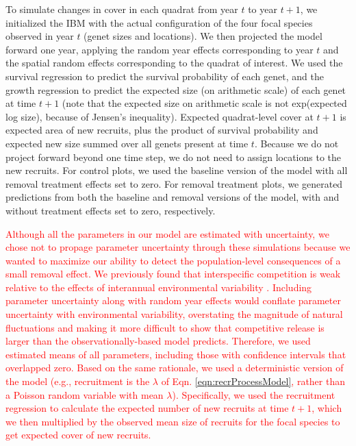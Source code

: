 \documentclass[11pt]{article}
\newcommand{\new}{\textcolor{red}}
\begin{document}
\begin{doublespacing}
To simulate changes in cover in each quadrat from year $t$ to year $t+1$, we initialized the IBM with the actual 
configuration of the four focal species observed in year $t$ (genet sizes and locations). 
We then projected the model forward one year, applying the random year effects corresponding to year $t$ and the spatial random effects corresponding to the quadrat of interest. 
We used the survival regression to predict the survival probability of each genet, and the growth regression to predict the expected size (on arithmetic scale) of each genet at time $t+1$ (note that the expected size on arithmetic scale is not exp(expected log size), because of Jensen's inequality). 
Expected quadrat-level cover at $t+1$ is expected area of new recruits, plus the product of survival probability and expected new size summed over all genets present at time $t$. 
Because we do not project forward beyond one time step, we do not need to assign locations to the new recruits. For control plots, we used the baseline version of the model with all 
removal treatment effects set to zero. For removal treatment plots, we generated predictions from both the baseline and removal versions of the model, 
with and without treatment effects set to zero, respectively.  

\new{Although all the parameters in our model are estimated with uncertainty, we chose not to propage parameter uncertainty through these 
simulations because we wanted to maximize our ability to detect the population-level consequences of a small removal effect. 
We previously found that interspecific competition is weak relative to the effects of interannual environmental variability 
\citep{Tredennick2017}. Including parameter uncertainty along with random year effects would conflate parameter uncertainty 
with environmental variability, overstating the magnitude of natural fluctuations and making it more difficult to show that competitive release
is larger than the observationally-based model predicts. Therefore, we used estimated means of all parameters, including those with 
confidence intervals that overlapped zero. Based on the same rationale, we used a deterministic version of the model (e.g., 
recruitment is the $\lambda$ of Eqn. \ref{eqn:recrProcessModel}, rather than a Poisson random variable with mean $\lambda$). 
Specifically, we used the recruitment regression to calculate the expected number of new recruits at time $t+1$, which we then multiplied 
by the observed mean size of recruits for the focal species to get expected cover of new recruits. }


\end{doublespacing}
\end{document}
